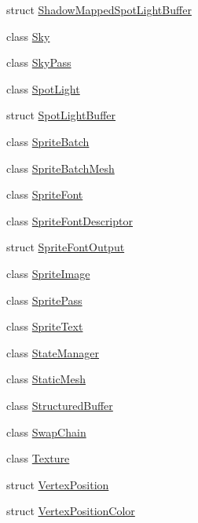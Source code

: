 \begin{DoxyCompactItemize}
\item 
struct \mbox{\hyperlink{structmage_1_1rendering_1_1_shadow_mapped_spot_light_buffer}{Shadow\+Mapped\+Spot\+Light\+Buffer}}
\item 
class \mbox{\hyperlink{classmage_1_1rendering_1_1_sky}{Sky}}
\item 
class \mbox{\hyperlink{classmage_1_1rendering_1_1_sky_pass}{Sky\+Pass}}
\item 
class \mbox{\hyperlink{classmage_1_1rendering_1_1_spot_light}{Spot\+Light}}
\item 
struct \mbox{\hyperlink{structmage_1_1rendering_1_1_spot_light_buffer}{Spot\+Light\+Buffer}}
\item 
class \mbox{\hyperlink{classmage_1_1rendering_1_1_sprite_batch}{Sprite\+Batch}}
\item 
class \mbox{\hyperlink{classmage_1_1rendering_1_1_sprite_batch_mesh}{Sprite\+Batch\+Mesh}}
\item 
class \mbox{\hyperlink{classmage_1_1rendering_1_1_sprite_font}{Sprite\+Font}}
\item 
class \mbox{\hyperlink{classmage_1_1rendering_1_1_sprite_font_descriptor}{Sprite\+Font\+Descriptor}}
\item 
struct \mbox{\hyperlink{structmage_1_1rendering_1_1_sprite_font_output}{Sprite\+Font\+Output}}
\item 
class \mbox{\hyperlink{classmage_1_1rendering_1_1_sprite_image}{Sprite\+Image}}
\item 
class \mbox{\hyperlink{classmage_1_1rendering_1_1_sprite_pass}{Sprite\+Pass}}
\item 
class \mbox{\hyperlink{classmage_1_1rendering_1_1_sprite_text}{Sprite\+Text}}
\item 
class \mbox{\hyperlink{classmage_1_1rendering_1_1_state_manager}{State\+Manager}}
\item 
class \mbox{\hyperlink{classmage_1_1rendering_1_1_static_mesh}{Static\+Mesh}}
\item 
class \mbox{\hyperlink{classmage_1_1rendering_1_1_structured_buffer}{Structured\+Buffer}}
\item 
class \mbox{\hyperlink{classmage_1_1rendering_1_1_swap_chain}{Swap\+Chain}}
\item 
class \mbox{\hyperlink{classmage_1_1rendering_1_1_texture}{Texture}}
\item 
struct \mbox{\hyperlink{structmage_1_1rendering_1_1_vertex_position}{Vertex\+Position}}
\item 
struct \mbox{\hyperlink{structmage_1_1rendering_1_1_vertex_position_color}{Vertex\+Position\+Color}}

\end{DoxyCompactItemize}
